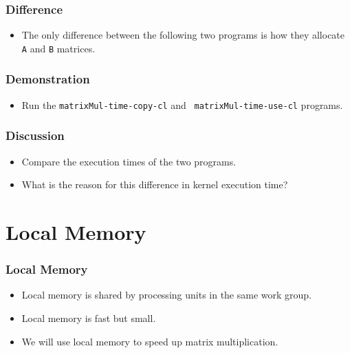 \documentclass{beamer}
\begin{document}
\begin{frame}
  \frametitle{Difference}
  \begin{itemize}
    \item The only difference between the following two programs is
      how they allocate {\tt A} and {\tt B} matrices.
  \end{itemize}
\end{frame}

\begin{frame}
\end{frame}

\begin{frame}
\end{frame}

\begin{frame}
  \frametitle{Demonstration}
  \begin{itemize}
    \item Run the {\tt matrixMul-time-copy-cl} and {\tt
      matrixMul-time-use-cl} programs.
  \end{itemize}
\end{frame}

\begin{frame}
  \frametitle{Discussion}
  \begin{itemize}
  \item Compare the execution times of the two programs.
  \item What is the reason for this difference in kernel execution
    time?
  \end{itemize}
\end{frame}

\section{Local Memory}

\begin{frame}
  \frametitle{Local Memory}
  \begin{itemize}
    \item Local memory is shared by processing units in the same work
      group.
    \item Local memory is fast but small.
    \item We will use local memory to speed up matrix multiplication.
  \end{itemize}
\end{frame}
\end{document}
